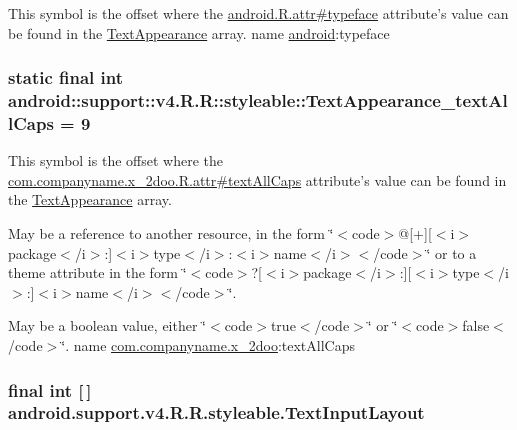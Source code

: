 This symbol is the offset where the \hyperlink{}{android.R.attr\#typeface} attribute's value can be found in the \hyperlink{classandroid_1_1support_1_1v4_1_1_r_1_1styleable_958f0ff7225bca693e30641e14dd4569}{TextAppearance} array.  name \hyperlink{namespaceandroid}{android}:typeface \hypertarget{classandroid_1_1support_1_1v4_1_1_r_1_1styleable_d6fbed48414bfa4d49f846b006cb67af}{
\subsubsection[{TextAppearance\_\-textAllCaps}]{\setlength{\rightskip}{0pt plus 5cm}static final int android::support::v4.R.R::styleable::TextAppearance\_\-textAllCaps = 9}}
\label{classandroid_1_1support_1_1v4_1_1_r_1_1styleable_d6fbed48414bfa4d49f846b006cb67af}


This symbol is the offset where the \hyperlink{classcom_1_1companyname_1_1x__2doo_1_1_r_1_1attr_440c890fd0d9d20178637dc0b7939341}{com.companyname.x\_\-2doo.R.attr\#textAllCaps} attribute's value can be found in the \hyperlink{classandroid_1_1support_1_1v4_1_1_r_1_1styleable_958f0ff7225bca693e30641e14dd4569}{TextAppearance} array.

May be a reference to another resource, in the form \char`\"{}$<$code$>$@\mbox{[}+\mbox{]}\mbox{[}$<$i$>$package$<$/i$>$:\mbox{]}$<$i$>$type$<$/i$>$:$<$i$>$name$<$/i$>$$<$/code$>$\char`\"{} or to a theme attribute in the form \char`\"{}$<$code$>$?\mbox{[}$<$i$>$package$<$/i$>$:\mbox{]}\mbox{[}$<$i$>$type$<$/i$>$:\mbox{]}$<$i$>$name$<$/i$>$$<$/code$>$\char`\"{}. 

May be a boolean value, either \char`\"{}$<$code$>$true$<$/code$>$\char`\"{} or \char`\"{}$<$code$>$false$<$/code$>$\char`\"{}.  name \hyperlink{namespacecom_1_1companyname_1_1x__2doo}{com.companyname.x\_\-2doo}:textAllCaps \hypertarget{classandroid_1_1support_1_1v4_1_1_r_1_1styleable_880beb171ce483ab1b63a82ef7f9d976}{
\subsubsection[{TextInputLayout}]{\setlength{\rightskip}{0pt plus 5cm}final int \mbox{[}$\,$\mbox{]} android.support.v4.R.R.styleable.TextInputLayout}}
\label{classandroid_1_1support_1_1v4_1_1_r_1_1styleable_880beb171ce483ab1b63a82ef7f9d976}


